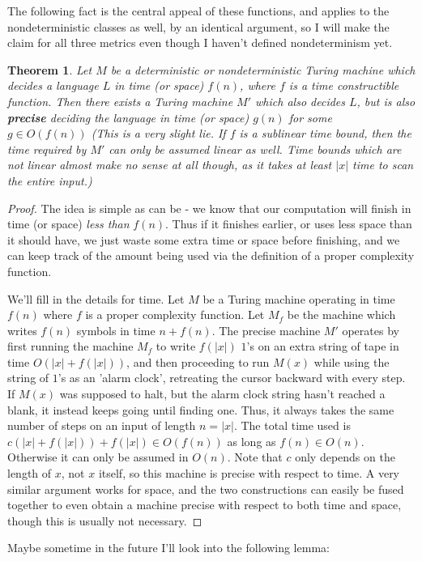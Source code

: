 \documentclass{article}
\theoremstyle{definition}
\theoremstyle{plain}
\theoremstyle{theorem}
\newtheorem{theorem}{Theorem}[section]
\begin{document}
The following fact is the central appeal of these functions, and applies to the nondeterministic classes as well, by an identical argument, so I will make the claim for all three metrics even though I haven't defined nondeterminism yet.
\begin{theorem}
	Let $M$ be a deterministic or nondeterministic Turing machine which decides a language $L$ in time (or space) $f(n)$, where $f$ is a time constructible function. Then there exists a Turing machine $M'$ which also decides $L$, but is also \textbf{precise} deciding the language in time (or space) $g(n)$ for some $g \in O(f(n))$ (This is a very slight lie. If $f$ is a sublinear time bound, then the time required by $M'$ can only be assumed linear as well. Time bounds which are not linear almost make no sense at all though, as it takes at least $|x|$ time to scan the entire input.)
\end{theorem}
\begin{proof}
	The idea is simple as can be - we know that our computation will finish in time (or space) \textit{less than} $f(n)$. Thus if it finishes earlier, or uses less space than it should have, we just waste some extra time or space before finishing, and we can keep track of the amount being used via the definition of a proper complexity function. 
	\par We'll fill in the details for time. Let $M$ be a Turing machine operating in time $f(n)$ where $f$ is a proper complexity function. Let $M_f$ be the machine which writes $f(n)$ symbols in time $n+f(n)$. The precise machine $M'$ operates by first running the machine $M_f$ to write $f(|x|)$ $1$'s on an extra string of tape in time $O(|x|+f(|x|))$, and then proceeding to run $M(x)$ while using the string of $1$'s as an 'alarm clock', retreating the cursor backward with every step. If $M(x)$ was supposed to halt, but the alarm clock string hasn't reached a blank, it instead keeps going until finding one. Thus, it always takes the same number of steps on an input of length $n = |x|$. The total time used is $c(|x|+f(|x|))+f(|x|) \in O(f(n))$ as long as $f(n) \in O(n)$. Otherwise it can only be assumed in $O(n)$. Note that $c$ only depends on the length of $x$, not $x$ itself, so this machine is precise with respect to time. A very similar argument works for space, and the two constructions can easily be fused together to even obtain a machine precise with respect to both time and space, though this is usually not necessary.  
\end{proof}
Maybe sometime in the future I'll look into the following lemma:
\end{document}
